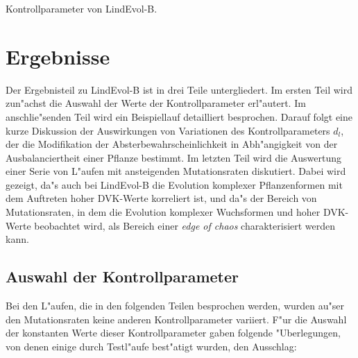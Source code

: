 \begin{table}[tb]
\caption{\label{lnd2-controlparams}
Kontrollparameter von LindEvol-B.
}
\end{table}

\section{Ergebnisse}
\label{lnd2-results}

Der Ergebnisteil zu LindEvol-B ist in drei Teile untergliedert. Im ersten Teil wird zun"achst die
Auswahl der Werte der Kontrollparameter erl"autert. Im anschlie"senden Teil wird ein Beispiellauf
detailliert besprochen. Darauf folgt eine kurze Diskussion der Auswirkungen von Variationen des
Kontrollparameters $d_l$, der die Modifikation der Absterbewahrscheinlichkeit in Abh"angigkeit von
der Ausbalanciertheit einer Pflanze bestimmt. Im letzten Teil wird die Auswertung einer Serie von
L"aufen mit ansteigenden Mutationsraten diskutiert. Dabei wird gezeigt, da"s auch bei LindEvol-B
die Evolution komplexer Pflanzenformen mit dem Auftreten hoher DVK-Werte korreliert ist, und da"s
der Bereich von Mutationsraten, in dem die Evolution komplexer Wuchsformen und hoher DVK-Werte beobachtet
wird, als Bereich einer \textsl{edge of chaos} charakterisiert werden kann.


\subsection{Auswahl der Kontrollparameter}
\label{lnd2-controlvalues}

Bei den L"aufen, die in den folgenden Teilen besprochen werden, wurden au"ser den Mutationsraten keine
anderen Kontrollparameter variiert. F"ur die Auswahl der konstanten Werte dieser Kontrollparameter
gaben folgende "Uberlegungen, von denen einige durch Testl"aufe best"atigt wurden, den Ausschlag:

